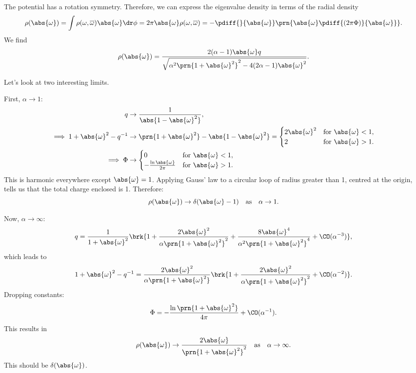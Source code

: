 \documentclass[12pt]{article}
\newcommand{\inv}{^{-1}}
\newcommand{\omb}{\overline{\omega}}
\newcommand{\oa}{\abs{\omega}}
\newcommand{\oas}{\abs{\omega}^2}
\newcommand{\opo}{\prn{1+\abs{\omega}^2}}
\newcommand{\omoa}{\abs{1-\abs{\omega}^2}}
\begin{document}
The potential has a rotation symmetry.
Therefore, we can express the eigenvalue density in terms of the radial density
%
\begin{equation}\label{eq:radialrho}
  \rho(\oa) = \int \rho(\omega,\omb)\oa\dr\phi = 2\pi\oa\rho(\omega,\omb)
   = -\pdiff{}{\oa}\prn{\oa\pdiff{(2\pi\Phi)}{\oa}}.
\end{equation}
%
We find
%
\begin{equation}\label{eq:radialrhosol}
\rho(\oa) = 
  \frac{2 (\alpha-1) \oa q}{\sqrt{\alpha^2\opo^2 - 4(2\alpha-1)\oas}}.
\end{equation}
%


Let's look at two interesting limits.

First, $\alpha\to1$:
%
\begin{equation}\label{eq:rszmphiato1}
\begin{aligned}
  q &\to \frac{1}{\omoa},\\
  \implies1+\abs{\omega}^2-q\inv &\to \opo-\omoa =
     \begin{cases}
       2\oas &\text{for } \abs{\omega}<1,\\
       2 &\text{for } \abs{\omega}>1.\\
     \end{cases}\\
  \implies\Phi &\to
     \begin{cases}
       0 &\text{for } \abs{\omega}<1,\\
       -\frac{\ln\abs{\omega}}{2\pi} &\text{for } \abs{\omega}>1.\\
     \end{cases}
\end{aligned}
\end{equation}
%
This is harmonic everywhere except $\abs{\omega}=1$.
Applying Gauss' law to a circular loop of radius greater than 1, centred at the origin, tells us that the total charge enclosed is 1.
Therefore:
%
\begin{equation}\label{eq:rhoato1}
  \rho(\oa) \to \delta(\abs{\omega}-1)
  \quad\text{as}\quad \alpha\to1.
\end{equation}
%


Now, $\alpha\to\infty$:
%
\begin{equation}\label{eq:rsatoinfty}
  q =
  \frac{1}{1+\abs{\omega}^2} \brk{1 + \frac{2\abs{\omega}^ 2}{\alpha\opo^2}
       + \frac{8\abs{\omega}^4}{\alpha^2\opo^4}
       + \CO(\alpha^{-3})},
\end{equation}
%
which leads to
%
\begin{equation}\label{eq:zmatoinfty}
  1+\abs{\omega}^2-q\inv =
  \frac{2\oas}{\alpha\opo} \brk{1 + \frac{2\abs{\omega}^2}{\alpha\opo^2} + \CO(\alpha^{-2})}.
\end{equation}
%
Dropping constants:
%
\begin{equation}\label{eq:phiatoinfty}
  \Phi = -\frac{\ln\opo}{4\pi} + \CO(\alpha^{-1}).
\end{equation}
%
This results in
%
\begin{equation}\label{eq:rhoatoinfty}
  \rho(\oa) \to \frac{2\oa}{\opo^2}
  \quad\text{as}\quad
  \alpha\to\infty.
\end{equation}
%
This should be $\delta(\oa)$.
\end{document}
